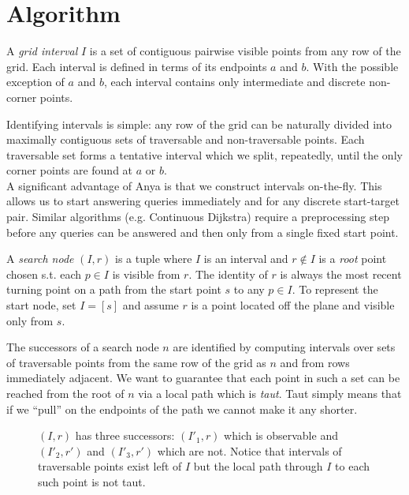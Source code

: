 \section{Algorithm}

\begin{defi}
\label{defi::interval}
A \emph{grid interval} $I$ is a set of contiguous pairwise visible points 
from any row of the grid.  Each interval is defined in terms 
of its endpoints $a$ and $b$. 
With the possible exception of $a$ and $b$, each interval
contains only intermediate and discrete non-corner points.
\end{defi}
Identifying intervals is simple: any row of the grid can be naturally divided
into maximally contiguous sets of traversable and non-traversable points.
Each traversable set forms a tentative interval which we split, repeatedly,
until the only corner points are found at $a$ or $b$.
\\
A significant advantage of Anya is that we construct intervals on-the-fly.
This allows us to start answering queries immediately and for any discrete
start-target pair. Similar algorithms (e.g. Continuous Dijkstra) require
a preprocessing step before any queries can be answered and then only
from a single fixed start point. 

\begin{defi}
\label{defi:searchnode}
A \emph{search node} $(I, r)$ is a tuple where $I$ is an interval and 
$r \not \in I$ is a \emph{root} point chosen s.t. each $p \in I$  
is visible from $r$. The identity of $r$ is always the most
recent turning point on a path from the start point $s$ to any $p \in I$.
To represent the start node, set $I = [s]$ and assume $r$ is a point located 
off the plane and visible only from $s$.
\end{defi}
The successors of a search node $n$ are identified by computing intervals
over sets of traversable points from the same row of the grid as $n$ and from rows
immediately adjacent. We want to guarantee that each point in such
a set can be reached from the root of $n$ via a local path which is \emph{taut}.
Taut simply means that if we ``pull'' on the endpoints of the path we cannot
make it any shorter.

\begin{figure}[tb]
  \begin{center}
    
  \end{center}
  \caption{$(I, r)$ has three successors: $(I'_1, r)$ which is observable
and $(I'_2, r')$ and $(I'_3, r')$ which are not. Notice that intervals of traversable
points exist left of $I$ but the local path through $I$ to each such point is
not taut.}
\label{fig::successors}
\end{figure}

